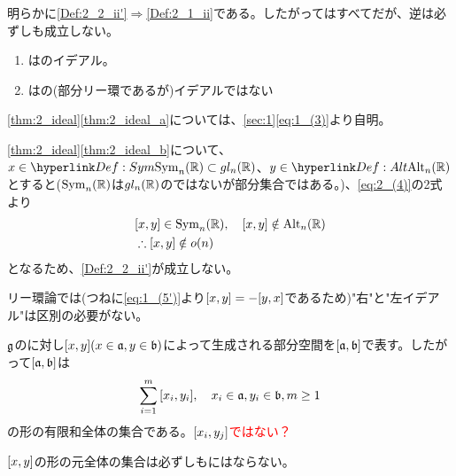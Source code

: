 \documentclass[fleqn,twocolumn,titlepage,dvipdfmx]{jsarticle}
\begin{document}
\begin{remark}
  明らかに\ref{Def:2_2_ii'}$\Rightarrow$\ref{Def:2_1_ii}である。したがって{}はすべて{}だが、逆は必ずしも成立しない。
\end{remark}
\begin{theorem}\label{thm:2_ideal}
  \begin{enumerate}[label=(\alph*)]
    \item \label{thm:2_ideal_a}はのイデアル。
    \item \label{thm:2_ideal_b}はの(部分リー環であるが)イデアルではない
  \end{enumerate}
\end{theorem}

\begin{Proof} \cref{thm:2_ideal}\ref{thm:2_ideal_a}については、\cref{sec:1}\eqref{eq:1_(3)}より自明。
\end{Proof}

\begin{Proof} \cref{thm:2_ideal}\ref{thm:2_ideal_b}について、$x\in\hlin{Def:Sym}{\Sym_n(\R)}\subset\gl_n(\R)$、$y\in\hlin{Def:Alt}{\Alt_n(\R)}$とすると($\operatorname{Sym}_n(\mathbb{R})$は$gl_n(\mathbb{R})$の{}ではないが部分集合ではある。)、\eqref{eq:2_(4)}の2式より
  \begin{align*}
    &\comm{x}{y}\in\Sym_n(\R)\qc
    \comm{x}{y}\notin\Alt_n(\R)\\
    &\therefore \comm{x}{y}\notin\o(n)
  \end{align*}
  となるため、\ref{Def:2_2_ii'}が成立しない。
\end{Proof}

\begin{remark}
  リー環論では(つねに\eqref{eq:1_(5')}より$\comm{x}{y}=-\comm{y}{x}$であるため)"右{}"と"左イデアル"は区別の必要がない。
\end{remark}

\begin{named}
  $\mathfrak{g}$の{}に対し$\comm{x}{y}(x\in\a,y\in\b)$によって生成される部分空間を$\comm{\a}{\b}$で表す。したがって$\comm{\a}{\b}$は
  \begin{align*}
    \sum_{i=1}^{m}\comm{x_{i}}{y_{i}}\qc x_{i}\in\a,y_{i}\in\b,m\ge1
  \end{align*}
  の形の有限和全体の集合である。\textcolor{red}{$\comm{x_{i}}{y_{j}}$ではない？}
\end{named}
\begin{remark}
  $\comm{x}{y}$の形の元全体の集合は必ずしも{}にはならない。
\end{remark}
\end{document}
